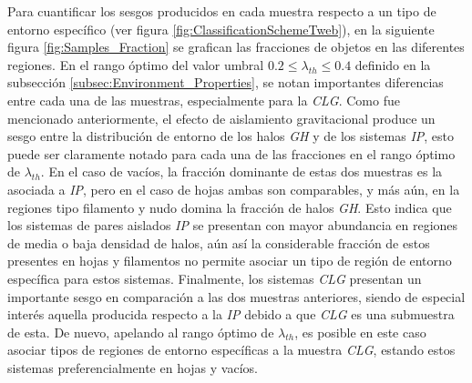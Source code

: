 Para cuantificar los sesgos producidos en cada muestra respecto a un tipo
de entorno específico (ver figura \ref{fig:ClassificationSchemeTweb}),
en la siguiente figura \ref{fig:Samples_Fraction} se grafican las 
fracciones de objetos en las diferentes regiones. En el rango óptimo del 
valor umbral $0.2\leq \lambda_{th}\leq 0.4$ definido en la subsección 
\ref{subsec:Environment_Properties}, se notan importantes diferencias entre
cada una de las muestras, especialmente para la \textit{CLG}. Como fue 
mencionado anteriormente, el efecto de aislamiento gravitacional produce
un sesgo entre la distribución de entorno de los halos \textit{GH} y de los 
sistemas \textit{IP}, esto puede ser claramente notado para cada una de las 
fracciones en el rango óptimo de $\lambda_{th}$. En el caso de vacíos, la 
fracción dominante de estas dos muestras es la asociada a \textit{IP}, pero 
en el caso de hojas ambas son comparables, y más aún, en la regiones tipo 
filamento y nudo domina la fracción de halos \textit{GH}. Esto indica que
los sistemas de pares aislados \textit{IP} se presentan con mayor 
abundancia en regiones de media o baja densidad de halos, aún así la 
considerable fracción de estos presentes en hojas y filamentos no permite 
asociar un tipo de región de entorno específica para estos sistemas. 
Finalmente, los sistemas \textit{CLG} presentan un importante sesgo 
en comparación a las dos muestras anteriores, siendo de especial interés 
aquella producida respecto a la \textit{IP} debido a que \textit{CLG} es 
una submuestra de esta. De nuevo, apelando al rango óptimo de $\lambda_{th}$,
es posible en este caso asociar tipos de regiones de entorno específicas 
a la muestra \textit{CLG}, estando estos sistemas preferencialmente en 
hojas y vacíos.

